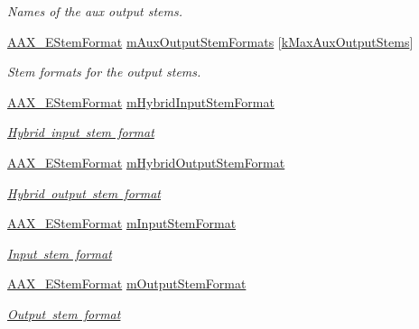 \begin{DoxyCompactItemize}
\begin{DoxyCompactList}\small\item\em Names of the aux output stems. \end{DoxyCompactList}\item 
\mbox{\hyperlink{a00491_ad8af5ef008b2bd478add9a0acb0a1d85}{A\+A\+X\+\_\+\+E\+Stem\+Format}} \mbox{\hyperlink{a01957_afd521b6b1d9b3d809e55c5c065859159}{m\+Aux\+Output\+Stem\+Formats}} \mbox{[}\mbox{\hyperlink{a00746_a3ce9db1fba97512379a8715f9cb166e4}{k\+Max\+Aux\+Output\+Stems}}\mbox{]}
\begin{DoxyCompactList}\small\item\em Stem formats for the output stems. \end{DoxyCompactList}\item 
\mbox{\hyperlink{a00491_ad8af5ef008b2bd478add9a0acb0a1d85}{A\+A\+X\+\_\+\+E\+Stem\+Format}} \mbox{\hyperlink{a01957_aeeee9ec016294caab1317d170ee0a2c2}{m\+Hybrid\+Input\+Stem\+Format}}
\begin{DoxyCompactList}\small\item\em \mbox{\hyperlink{a00805_ga13e384f22825afd3db6d68395b79ce0da33a950bc2e02d38fc3be0a0ad8cc89b1}{Hybrid input stem format}} \end{DoxyCompactList}\item 
\mbox{\hyperlink{a00491_ad8af5ef008b2bd478add9a0acb0a1d85}{A\+A\+X\+\_\+\+E\+Stem\+Format}} \mbox{\hyperlink{a01957_a1cc911c56d96a35affcc8fea94a983ae}{m\+Hybrid\+Output\+Stem\+Format}}
\begin{DoxyCompactList}\small\item\em \mbox{\hyperlink{a00805_ga13e384f22825afd3db6d68395b79ce0dac30a4e73772e37267dfef39ae3122705}{Hybrid output stem format}} \end{DoxyCompactList}\item 
\mbox{\hyperlink{a00491_ad8af5ef008b2bd478add9a0acb0a1d85}{A\+A\+X\+\_\+\+E\+Stem\+Format}} \mbox{\hyperlink{a01957_aeb7ea647e496b742bc5bad5576f5ec1f}{m\+Input\+Stem\+Format}}
\begin{DoxyCompactList}\small\item\em \mbox{\hyperlink{a00662_a13e384f22825afd3db6d68395b79ce0dadebf03028b758123965a8b988fa2df99}{Input stem format}} \end{DoxyCompactList}\item 
\mbox{\hyperlink{a00491_ad8af5ef008b2bd478add9a0acb0a1d85}{A\+A\+X\+\_\+\+E\+Stem\+Format}} \mbox{\hyperlink{a01957_ac69ab2fe88b00dfb6f22d7e2ebfa134d}{m\+Output\+Stem\+Format}}
\begin{DoxyCompactList}\small\item\em \mbox{\hyperlink{a00662_a13e384f22825afd3db6d68395b79ce0da211fdc6277e7fa652b5d482e810b0bc9}{Output stem format}} \end{DoxyCompactList}\item 

\end{DoxyCompactItemize}
